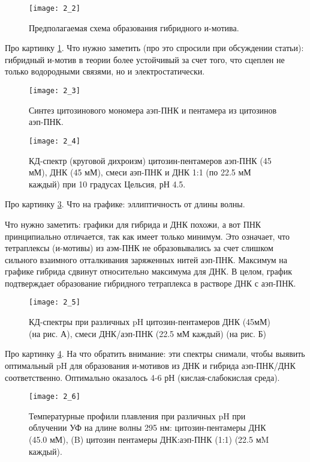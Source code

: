 \begin{figure}[H]
	\centering
	\texttt{[image: 2\_2]}
	\caption{Предполагаемая схема образования гибридного и-мотива.}
	\label{fig:2_2}
\end{figure}

Про картинку \ref{fig:2_2}. Что нужно заметить (про это спросили при обсуждении статьи): гибридный и-мотив в теории более устойчивый за счет того, что сцеплен не только водородными связями, но и электростатически.

\begin{figure}[H]
	\centering
	\texttt{[image: 2\_3]}
	\caption{Синтез цитозинового мономера аэп-ПНК и пентамера из цитозинов аэп-ПНК.}
	\label{fig:2_3}
\end{figure}

\begin{figure}[H]
	\centering
	\texttt{[image: 2\_4]}
	\caption{КД-спектр (круговой дихроизм)  цитозин-пентамеров аэп-ПНК (45 мМ), ДНК (45 мМ), смеси аэп-ПНК и ДНК 1:1 (по 22.5 мМ каждый) при 10 градусах Цельсия,  рН 4.5.}
	\label{fig:2_4}
\end{figure}

Про картинку \ref{fig:2_4}. Что на графике: эллиптичность от длины волны.

Что нужно заметить: графики для гибрида и ДНК похожи, а вот ПНК принципиально отличается, так как имеет только минимум. Это означает, что тетраплексы (и-мотивы) из аэм-ПНК не образовывались за счет слишком сильного взаимного отталкивания заряженных нитей аэп-ПНК. Максимум на графике гибрида сдвинут относительно максимума для ДНК. В целом, график подтверждает образование гибридного тетраплекса в растворе ДНК с аэп-ПНК.

\begin{figure}[H]
	\centering
	\texttt{[image: 2\_5]}
	\caption{КД-спектры при различных pH цитозин-пентамеров ДНК (45мМ) (на рис. А), смеси ДНК/аэп-ПНК (22.5 мМ каждый) (на рис. Б)}
	\label{fig:2_5}
\end{figure}

Про картинку \ref{fig:2_5}. На что обратить внимание: эти спектры снимали, чтобы выявить оптимальный pH для образования и-мотивов из ДНК и гибрида аэп-ПНК/ДНК соответственно. Оптимально оказалось 4-6 рН (кислая-слабокислая среда).

\begin{figure}[H]
	\centering
	\texttt{[image: 2\_6]}
	\caption{Температурные профили плавления при различных pH при облучении УФ на длине волны 295 нм: цитозин-пентамеры ДНК (45.0 мМ), (B) цитозин пентамеры ДНК:аэп-ПНК (1:1) (22.5 мM каждый).}
	\label{fig:2_6}
\end{figure}


